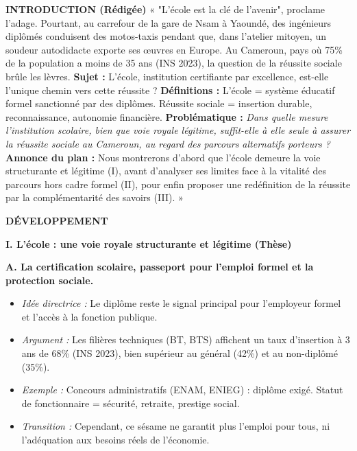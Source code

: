 \documentclass[11pt]{article}
\begin{document}
\begin{exoresolu}
\noindent\textbf{INTRODUCTION (Rédigée)}
« "L'école est la clé de l'avenir", proclame l'adage. Pourtant, au carrefour de la gare de Nsam à Yaoundé, des ingénieurs diplômés conduisent des motos-taxis pendant que, dans l'atelier mitoyen, un soudeur autodidacte exporte ses œuvres en Europe. Au Cameroun, pays où 75\% de la population a moins de 35 ans (INS 2023), la question de la réussite sociale brûle les lèvres. \textbf{Sujet :} L'école, institution certifiante par excellence, est-elle l'unique chemin vers cette réussite ? \textbf{Définitions :} L'école = système éducatif formel sanctionné par des diplômes. Réussite sociale = insertion durable, reconnaissance, autonomie financière. \textbf{Problématique :} \emph{Dans quelle mesure l'institution scolaire, bien que voie royale légitime, suffit-elle à elle seule à assurer la réussite sociale au Cameroun, au regard des parcours alternatifs porteurs ?} \textbf{Annonce du plan :} Nous montrerons d'abord que l'école demeure la voie structurante et légitime (I), avant d'analyser ses limites face à la vitalité des parcours hors cadre formel (II), pour enfin proposer une redéfinition de la réussite par la complémentarité des savoirs (III). »

\noindent\textbf{DÉVELOPPEMENT}

\noindent\textbf{I. L'école : une voie royale structurante et légitime (Thèse)}

\noindent\textbf{A. La certification scolaire, passeport pour l'emploi formel et la protection sociale.}
\begin{itemize}
    \item \textit{Idée directrice :} Le diplôme reste le signal principal pour l'employeur formel et l'accès à la fonction publique.
    \item \textit{Argument :} Les filières techniques (BT, BTS) affichent un taux d'insertion à 3 ans de 68\% (INS 2023), bien supérieur au général (42\%) et au non-diplômé (35\%).
    \item \textit{Exemple :} Concours administratifs (ENAM, ENIEG) : diplôme exigé. Statut de fonctionnaire = sécurité, retraite, prestige social.
    \item \textit{Transition :} Cependant, ce sésame ne garantit plus l'emploi pour tous, ni l'adéquation aux besoins réels de l'économie.
\end{itemize}


\end{exoresolu}
\end{document}
